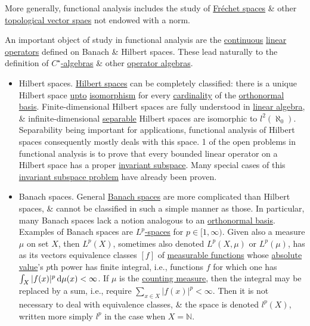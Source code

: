 \documentclass{article}
\begin{document}
More generally, functional analysis includes the study of \href{https://en.wikipedia.org/wiki/Fr%C3%A9chet_space}{Fr\'echet spaces} \& other \href{https://en.wikipedia.org/wiki/Topological_vector_space}{topological vector spaes} not endowed with a norm.

An important object of study in functional analysis are the \href{https://en.wikipedia.org/wiki/Continuous_function_(topology)}{continuous} \href{https://en.wikipedia.org/wiki/Linear_transformation}{linear operators} defined on Banach \& Hilbert spaces. These lead naturally to the definition of \href{https://en.wikipedia.org/wiki/C*-algebra}{$C^\star$-algebras} \& other \href{https://en.wikipedia.org/wiki/Operator_algebra}{operator algebras}.
\begin{itemize}
	\item {\sf Hilbert spaces.} \href{https://en.wikipedia.org/wiki/Hilbert_space}{Hilbert spaces} can be completely classified: there is a unique Hilbert space \href{https://en.wikipedia.org/wiki/Up_to}{upto} \href{https://en.wikipedia.org/wiki/Isomorphism}{isomorphism} for every \href{https://en.wikipedia.org/wiki/Cardinal_number}{cardinality} of the \href{https://en.wikipedia.org/wiki/Orthonormal_basis}{orthonormal basis}. Finite-dimensional Hilbert spaces are fully understood in \href{https://en.wikipedia.org/wiki/Linear_algebra}{linear algebra}, \& infinite-dimensional \href{https://en.wikipedia.org/wiki/Separable_space}{separable} Hilbert spaces are isomorphic to $l^2(\aleph_0)$. Separability being important for applications, functional analysis of Hilbert spaces consequently mostly deals with this space. 1 of the open problems in functional analysis is to prove that every bounded linear operator on a Hilbert space has a proper \href{https://en.wikipedia.org/wiki/Invariant_subspace}{invariant subspace}. Many special cases of this \href{https://en.wikipedia.org/wiki/Invariant_subspace_problem}{invariant subspace problem} have already been proven.
	\item {\sf Banach spaces.} General \href{https://en.wikipedia.org/wiki/Banach_space}{Banach spaces} are more complicated than Hilbert spaces, \& cannot be classified in such a simple manner as those. In particular, many Banach spaces lack a notion analogous to an \href{https://en.wikipedia.org/wiki/Orthonormal_basis}{orthonormal basis}. Examples of Banach spaces are \href{https://en.wikipedia.org/wiki/Lp_space}{$L^p$-spaces} for $p\in[1,\infty)$. Given also a measure $\mu$ on set $X$, then $L^p(X)$, sometimes also denoted $L^p(X,\mu)$ or $L^p(\mu)$, has as its vectors equivalence classes $[f]$ of \href{https://en.wikipedia.org/wiki/Lebesgue-measurable_function}{measurable functions} whose \href{https://en.wikipedia.org/wiki/Absolute_value}{absolute value}'s $p$th power has finite integral, i.e., functions $f$ for which one has $\int_X |f(x)|^p\,{\rm d}\mu(x) < \infty$. If $\mu$ is the \href{https://en.wikipedia.org/wiki/Counting_measure}{counting measure}, then the integral may be replaced by a sum, i.e., require $\sum_{x\in X} |f(x)|^p < \infty$. Then it is not necessary to deal with equivalence classes, \& the space is denoted $l^p(X)$, written more simply $l^p$ in the case when $X = \mathbb{N}$.
	

\end{itemize}
\end{document}
